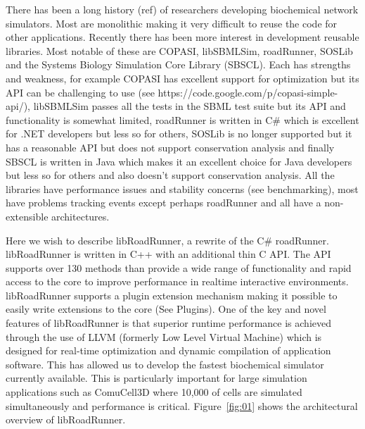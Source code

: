 \documentclass{bioinfo}
\begin{document}
There has been a long history (ref) of researchers developing \citep{Bag01} biochemical network simulators. Most are monolithic making it very difficult to reuse the code for other applications. Recently there has been more interest in development reusable libraries. Most notable of these are COPASI, libSBMLSim, roadRunner, SOSLib and the Systems Biology Simulation Core Library (SBSCL). Each has strengths and weakness, for example COPASI has excellent support for optimization but its API can be challenging to use (see https://code.google.com/p/copasi-simple-api/), libSBMLSim passes all the tests in the SBML test suite but its API and functionality is somewhat limited, roadRunner is written in C\# which is excellent for .NET developers but less so for others, SOSLib is no longer supported but it has a reasonable API but does not support conservation analysis and finally SBSCL is written in Java which makes it an excellent choice for Java developers but less so for others and also doesn't support conservation analysis. All the libraries have performance issues and stability concerns (see benchmarking), most have problems tracking events except perhaps roadRunner and all have a non-extensible architectures.

Here we wish to describe libRoadRunner, a rewrite of the C\# roadRunner. libRoadRunner is written in C++ with an additional thin C API. The API supports over 130 methods than provide a wide range of functionality and rapid access to the core to improve performance in realtime interactive environments. libRoadRunner supports a plugin extension mechanism making it possible to easily write extensions to the core (See Plugins). One of the key and novel features of libRoadRunner is that superior runtime performance is achieved through the use of LLVM (formerly Low Level Virtual Machine) which is designed for real-time optimization and dynamic compilation of application software. This has allowed us to develop the fastest biochemical simulator currently available. This is particularly important for large simulation applications such as ComuCell3D where 10,000 of cells are simulated simultaneously and performance is critical. Figure~\ref{fig:01} shows the architectural overview of libRoadRunner.
\end{document}
